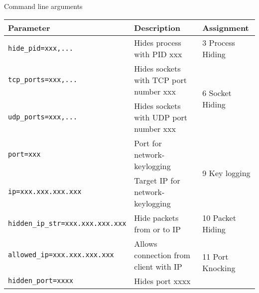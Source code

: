 \begin{subsubsection}{Command line arguments}
\label{sec:arg}
\begin{center}
\begin{tabular}{|l|l|l|}
\hline
Parameter & Description & Assignment\\\hline
\texttt{hide\_pid=xxx,...} & Hides process with PID xxx & 3 Process Hiding
\\ \hline
\texttt{tcp\_ports=xxx,...}& Hides sockets with TCP port number xxx& \multirow{2}{*}{6 Socket Hiding} 
\\ \cline{1-2}
\texttt{udp\_ports=xxx,...}& Hides sockets with UDP port number xxx& \\ \hline
\texttt{port=xxx} & Port for network-keylogging&\multirow{2}{*}{9 Key logging} 
\\ \cline{1-2}
\texttt{ip=xxx.xxx.xxx.xxx} & Target IP for network-keylogging& \\ \hline
\texttt{hidden\_ip\_str=xxx.xxx.xxx.xxx} & Hide packets from or to IP & 10 Packet Hiding
\\\hline
\texttt{allowed\_ip=xxx.xxx.xxx.xxx} & Allows connection from client with IP & \multirow{2}{*}{11 Port Knocking}
\\\cline{1-2}
\texttt{hidden\_port=xxxx} & Hides port xxxx & \\ \hline
\end{tabular}
\end{center}
\end{subsubsection}

